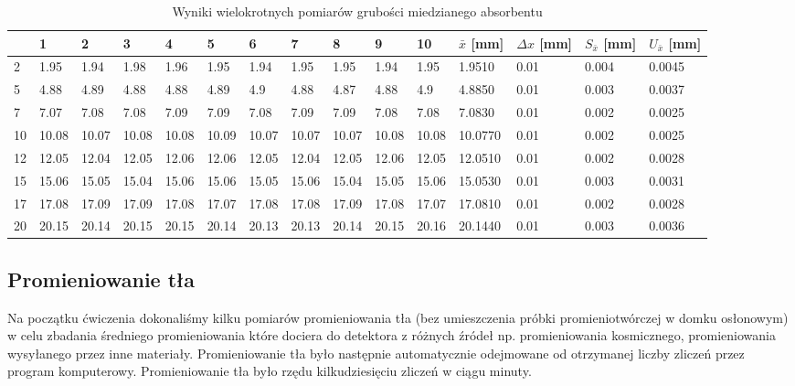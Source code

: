 \documentclass[a4paper]{article}
\newlength{\du}
\begin{document}
\begin{table}[h!]
\centering
\begin{tabular}{ | l | l | l | l | l | l | l | l | l | l | l | l | l | l | l |}
\hline
 & 1 & 2 & 3 & 4 & 5 & 6 & 7 & 8 & 9 & 10 & $\bar{x}$ [mm] & $\Delta x$ [mm] & $S_{\bar{x}}$ [mm] & $U_{\bar{x}}$ [mm] \\ \hline
2 & 1.95 & 1.94 & 1.98 & 1.96 & 1.95 & 1.94 & 1.95 & 1.95 & 1.94 & 1.95 & 1.9510 & 0.01 & 0.004 & 0.0045\\ \hline
5 & 4.88 & 4.89 & 4.88 & 4.88 & 4.89 & 4.9 & 4.88 & 4.87 & 4.88 & 4.9 & 4.8850 & 0.01 & 0.003 & 0.0037 \\ \hline
7 & 7.07 & 7.08 & 7.08 & 7.09 & 7.09 & 7.08 & 7.09 & 7.09 & 7.08 & 7.08 & 7.0830 & 0.01 & 0.002 & 0.0025 \\ \hline
10 & 10.08 & 10.07 & 10.08 & 10.08 & 10.09 & 10.07 & 10.07 & 10.07 & 10.08 & 10.08 & 10.0770 & 0.01 & 0.002 & 0.0025\\ \hline
12 & 12.05 & 12.04 & 12.05 & 12.06 & 12.06 & 12.05 & 12.04 & 12.05 & 12.06 & 12.05 & 12.0510 & 0.01 & 0.002 & 0.0028\\ \hline
15 & 15.06 & 15.05 & 15.04 & 15.06 & 15.06 & 15.05 & 15.06 & 15.04 & 15.05 & 15.06 & 15.0530 & 0.01 & 0.003 & 0.0031\\ \hline
17 & 17.08 & 17.09 & 17.09 & 17.08 & 17.07 & 17.08 & 17.08 & 17.09 & 17.08 & 17.07 & 17.0810 & 0.01 & 0.002 & 0.0028\\ \hline
20 & 20.15 & 20.14 & 20.15 & 20.15 & 20.14 & 20.13 & 20.13 & 20.14 & 20.15 & 20.16 & 20.1440 & 0.01 & 0.003 & 0.0036\\ \hline
\end{tabular}
\caption{Wyniki wielokrotnych pomiarów grubości miedzianego absorbentu}
\label{pomiary_sruba}
\end{table}



\subsection{Promieniowanie tła}
Na początku ćwiczenia dokonaliśmy kilku pomiarów promieniowania tła (bez umieszczenia próbki promieniotwórczej w domku osłonowym) w celu zbadania średniego promieniowania które dociera do detektora z różnych źródeł np. promieniowania kosmicznego, promieniowania wysyłanego przez inne materiały. Promieniowanie tła było następnie automatycznie odejmowane od otrzymanej liczby zliczeń przez program komputerowy. Promieniowanie tła było rzędu kilkudziesięciu zliczeń w ciągu minuty.
\end{document}
